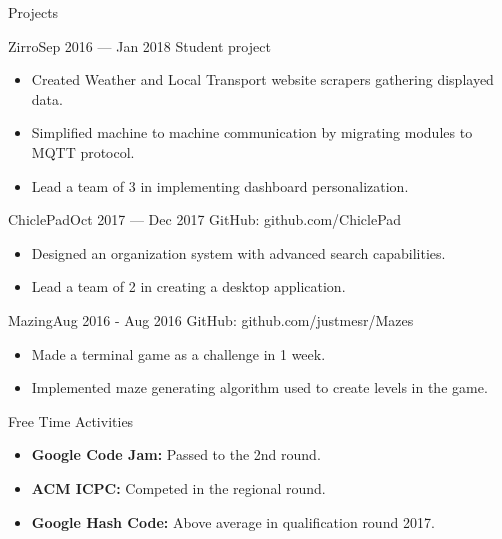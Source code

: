 \documentclass[]{style}
\begin{document}
	\begin{cvsection}{Projects}
		\begin{cvsubsection}{Zirro}{}{Sep 2016 — Jan 2018}
			Student project
			\begin{itemize}
				\item Created Weather and Local Transport website scrapers gathering displayed data.
				\item Simplified machine to machine communication by migrating modules to MQTT protocol.
				\item Lead a team of 3 in implementing dashboard personalization.
			\end{itemize}
		\end{cvsubsection}

		\begin{cvsubsection}{ChiclePad}{}{Oct 2017 — Dec 2017}
			GitHub: github.com/ChiclePad
			\begin{itemize}
				\item Designed an organization system with advanced search capabilities.
				\item Lead a team of 2 in creating a desktop application.
			\end{itemize}
		\end{cvsubsection}

		\begin{cvsubsection}{Mazing}{}{Aug 2016 - Aug 2016}
			GitHub: github.com/justmesr/Mazes
			\begin{itemize}
				\item Made a terminal game as a challenge in 1 week.
				\item Implemented maze generating algorithm used to create levels in the game. 
			\end{itemize}
		\end{cvsubsection}
	\end{cvsection}
	
	\begin{cvsection}{Free Time Activities}
		\begin{cvsubsection}{}{}{}	
			\begin{itemize}
				\item \textbf{Google Code Jam:} Passed to the 2nd round.
                \item \textbf{ACM ICPC:} Competed in the regional round.
                \item \textbf{Google Hash Code:} Above average in qualification round 2017.
			\end{itemize}
		\end{cvsubsection}
	\end{cvsection}
	
\end{document}
